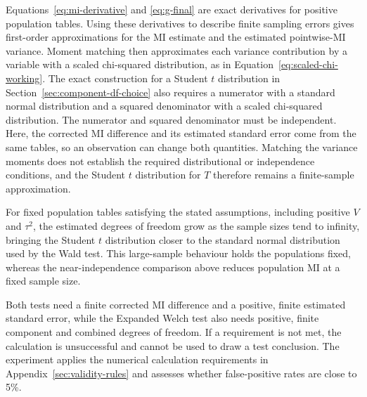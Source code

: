 \begin{samepage}
\medskip
{}

Equations~\eqref{eq:mi-derivative} and \eqref{eq:g-final} are exact
derivatives for positive population tables. Using these derivatives to
describe finite sampling errors gives first-order approximations for the
MI estimate and the estimated pointwise-MI variance. Moment matching then
approximates each variance contribution by a variable with a scaled
chi-squared distribution, as in Equation~\eqref{eq:scaled-chi-working}.
The exact construction for a Student \(t\) distribution in
Section~\ref{sec:component-df-choice} also requires a numerator with a
standard normal distribution and a squared denominator with a scaled
chi-squared distribution. The numerator and squared denominator must be
independent. Here, the corrected MI
difference and its estimated standard error come from the same tables, so
an observation can change both quantities. Matching the variance moments
does not establish the required
distributional or independence conditions, and the Student \(t\) distribution
for \(T\) therefore remains a finite-sample approximation.

For fixed population tables satisfying the stated assumptions, including
positive \(V\) and \(\tau^2\), the estimated degrees of freedom grow as
the sample sizes tend to infinity, bringing the Student \(t\) distribution
closer to the standard normal distribution used by the Wald test. This large-sample behaviour holds the
populations fixed, whereas the near-independence comparison above reduces
population MI at a fixed sample size.
\par\nopagebreak[4]

Both tests need a finite corrected MI difference and a positive, finite
estimated standard error, while the Expanded Welch test also needs positive, finite component
and combined degrees of freedom. If a requirement is not met, the calculation
is unsuccessful and cannot be used to draw a test conclusion.
The experiment applies the numerical calculation requirements in
Appendix~\ref{sec:validity-rules} and assesses whether false-positive rates
are close to 5\%.
\par
\end{samepage}
